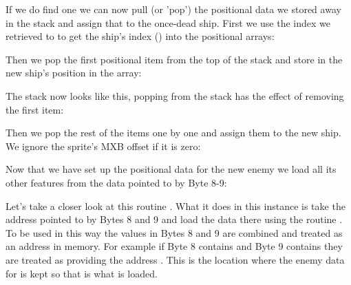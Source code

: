If we do find one we can now pull (or 'pop') the positional data we stored away in the stack and assign that to the once-dead
ship. First we use the index we retrieved to  to get the ship's index () into the positional arrays:

%


Then we pop the first positional item  from the top of the stack and store in the new
ship's position in the array:

%


The stack now looks like this, popping from the stack has the effect of removing the first item:

\begin{figure}[H]
  {
    \setlength{\tabcolsep}{3.0pt}
    \setlength\cmidrulewidth{\heavyrulewidth} %
    \begin{adjustbox}{width=10cm,center}
    \end{adjustbox}

  }
\end{figure}

Then we pop the rest of the items one by one and assign them to the new ship. We ignore the sprite's MXB offset if it is
zero:
%


Now that we have set up the positional data for the new enemy we load all its other features from the data pointed
to by Byte 8-9:

%


Let's take a closer look at this routine . What it does in this
instance is take the address pointed to by Bytes 8 and 9 and load the data there using the routine
. To be used in this way the values in Bytes 8 and 9 are combined and treated
as an address in memory. For example if Byte 8 contains  and Byte 9 contains  they
are treated as providing the address . This is the location where the enemy data for
 is kept so that is what is loaded.



